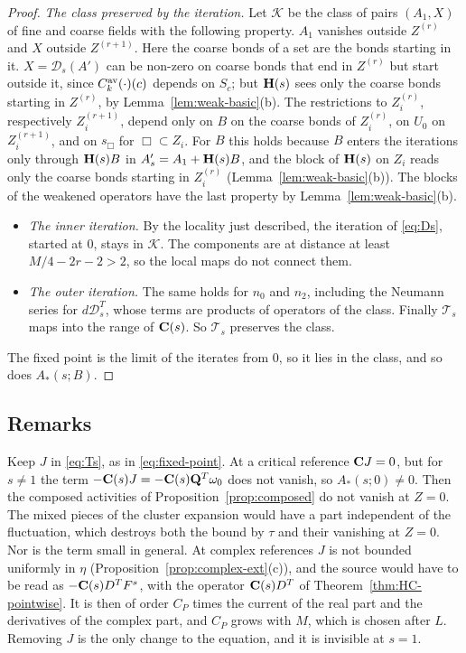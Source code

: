 \begin{proof}
\emph{The class preserved by the iteration.} Let $\mathcal K$ be the class of pairs $(A_1,X)$ of fine and coarse fields with the following property. $A_1$ vanishes outside $Z^{(r)}$ and $X$ outside $Z^{(r+1)}$. Here the coarse bonds of a set are the bonds starting in it. $X=\mathcal D_s(A')$ can be non-zero on coarse bonds that end in $Z^{(r)}$ but start outside it, since $C^{\rm av}_k(\cdot)(c)$ depends on $S_c$; but $\mathbf H(s)$ sees only the coarse bonds starting in $Z^{(r)}$, by Lemma~\ref{lem:weak-basic}(b). The restrictions to $Z_i^{(r)}$, respectively $Z_i^{(r+1)}$, depend only on $B$ on the coarse bonds of $Z_i^{(r)}$, on $U_0$ on $Z_i^{(r+1)}$, and on $s_\Box$ for $\Box\subset Z_i$. For $B$ this holds because $B$ enters the iterations only through $\mathbf H(s)B$ in $A'_s=A_1+\mathbf H(s)B$, and the block of $\mathbf H(s)$ on $Z_i$ reads only the coarse bonds starting in $Z_i^{(r)}$ (Lemma~\ref{lem:weak-basic}(b)). The blocks of the weakened operators have the last property by Lemma~\ref{lem:weak-basic}(b).
\begin{itemize}
\item \emph{The inner iteration.} By the locality just described, the iteration of \eqref{eq:Ds}, started at $0$, stays in $\mathcal K$. The components are at distance at least $M/4-2r-2>2$, so the local maps do not connect them.
\item \emph{The outer iteration.} The same holds for $n_0$ and $n_2$, including the Neumann series for $d\mathcal D_s^T$, whose terms are products of operators of the class. Finally $\mathcal T_s$ maps into the range of $\mathbf C(s)$. So $\mathcal T_s$ preserves the class.
\end{itemize}
The fixed point is the limit of the iterates from $0$, so it lies in the class, and so does $A_*(s;B)$.
\end{proof}

\subsection{Remarks}\label{ss:45.5}

\begin{remark}\label{x:45.6}
Keep $J$ in \eqref{eq:Ts}, as in \eqref{eq:fixed-point}. At a critical reference $\mathbf C J=0$, but for $s\ne1$ the term $-\mathbf C(s)J=-\mathbf C(s)\mathbf Q^T\omega_0$ does not vanish, so $A_*(s;0)\ne0$. Then the composed activities of Proposition~\ref{prop:composed} do not vanish at $Z=0$. The mixed pieces of the cluster expansion would have a part independent of the fluctuation, which destroys both the bound by $\tau$ and their vanishing at $Z=0$. Nor is the term small in general. At complex references $J$ is not bounded uniformly in $\eta$ (Proposition~\ref{prop:complex-ext}(c)), and the source would have to be read as $-\mathbf C(s)D^TF^s$, with the operator $\mathbf C(s)D^T$ of Theorem~\ref{thm:HC-pointwise}. It is then of order $C_P$ times the current of the real part and the derivatives of the complex part, and $C_P$ grows with $M$, which is chosen after $L$. Removing $J$ is the only change to the equation, and it is invisible at $s=1$.
\end{remark}

